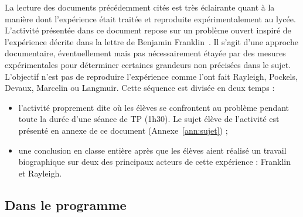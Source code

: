 \documentclass[12pt,a4paper]{article}
\begin{document}
La lecture des documents précédemment cités est très éclairante quant à la manière dont l'expérience était traitée et reproduite expérimentalement au lycée.
L'activité présentée dans ce document repose sur un problème ouvert inspiré de l'expérience décrite dans la lettre de Benjamin Franklin~\cite{Franklin1773a}.
Il s'agit d'une approche documentaire, éventuellement mais pas nécessairement étayée par des mesures expérimentales pour déterminer certaines grandeurs non précisées dans le sujet.
L'objectif n'est pas de reproduire l'expérience comme l'ont fait Rayleigh, Pockels, Devaux, Marcelin ou Langmuir.
Cette séquence est divisée en deux temps :
\begin{itemize}
\item l'activité proprement dite où les élèves se confrontent au problème pendant toute la durée d'une séance de TP (1h30).
Le sujet élève de l'activité est présenté en annexe de ce document (Annexe~\ref{ann:sujet}) ;
\item une conclusion en classe entière après que les élèves aient réalisé un travail biographique sur deux des principaux acteurs de cette expérience : Franklin et Rayleigh.
\end{itemize}

\subsection{Dans le programme}
\end{document}
